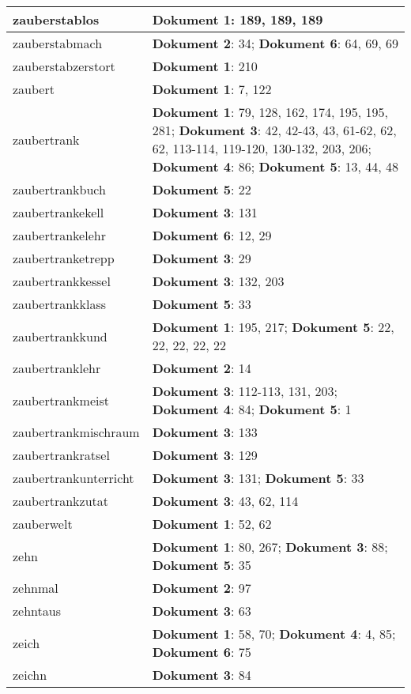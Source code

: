 \documentclass[a5paper]{article}
\begin{document}
\begin{longtable}[l]{|l|p{3in}|}
\hline
zauberstablos & \textbf{Dokument 1}: 189, 189, 189 \\
\hline
zauberstabmach & \textbf{Dokument 2}: 34; \textbf{Dokument 6}: 64, 69, 69 \\
\hline
zauberstabzerstort & \textbf{Dokument 1}: 210 \\
\hline
zaubert & \textbf{Dokument 1}: 7, 122 \\
\hline
zaubertrank & \textbf{Dokument 1}: 79, 128, 162, 174, 195, 195, 281; \textbf{Dokument 3}: 42, 42-43, 43, 61-62, 62, 62, 113-114, 119-120, 130-132, 203, 206; \textbf{Dokument 4}: 86; \textbf{Dokument 5}: 13, 44, 48 \\
\hline
zaubertrankbuch & \textbf{Dokument 5}: 22 \\
\hline
zaubertrankekell & \textbf{Dokument 3}: 131 \\
\hline
zaubertrankelehr & \textbf{Dokument 6}: 12, 29 \\
\hline
zaubertranketrepp & \textbf{Dokument 3}: 29 \\
\hline
zaubertrankkessel & \textbf{Dokument 3}: 132, 203 \\
\hline
zaubertrankklass & \textbf{Dokument 5}: 33 \\
\hline
zaubertrankkund & \textbf{Dokument 1}: 195, 217; \textbf{Dokument 5}: 22, 22, 22, 22, 22 \\
\hline
zaubertranklehr & \textbf{Dokument 2}: 14 \\
\hline
zaubertrankmeist & \textbf{Dokument 3}: 112-113, 131, 203; \textbf{Dokument 4}: 84; \textbf{Dokument 5}: 1 \\
\hline
zaubertrankmischraum & \textbf{Dokument 3}: 133 \\
\hline
zaubertrankratsel & \textbf{Dokument 3}: 129 \\
\hline
zaubertrankunterricht & \textbf{Dokument 3}: 131; \textbf{Dokument 5}: 33 \\
\hline
zaubertrankzutat & \textbf{Dokument 3}: 43, 62, 114 \\
\hline
zauberwelt & \textbf{Dokument 1}: 52, 62 \\
\hline
zehn & \textbf{Dokument 1}: 80, 267; \textbf{Dokument 3}: 88; \textbf{Dokument 5}: 35 \\
\hline
zehnmal & \textbf{Dokument 2}: 97 \\
\hline
zehntaus & \textbf{Dokument 3}: 63 \\
\hline
zeich & \textbf{Dokument 1}: 58, 70; \textbf{Dokument 4}: 4, 85; \textbf{Dokument 6}: 75 \\
\hline
zeichn & \textbf{Dokument 3}: 84 \\

\end{longtable}
\end{document}
